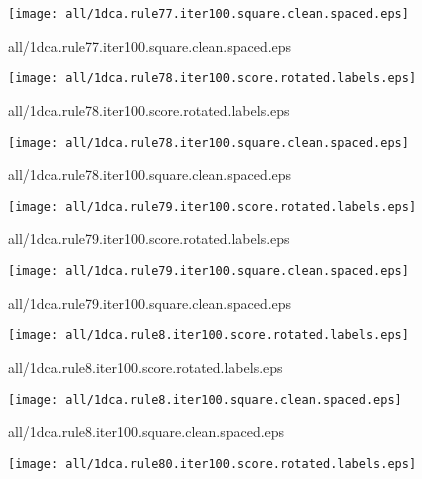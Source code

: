 \documentclass{article}
\begin{document}
\begin{center}
\begin{minipage}{\textwidth}
\texttt{[image: all/1dca.rule77.iter100.square.clean.spaced.eps]}
\end{minipage}
\end{center}
{\footnotesize all/1dca.rule77.iter100.square.clean.spaced.eps}
\begin{center}
\begin{minipage}{\textwidth}
\texttt{[image: all/1dca.rule78.iter100.score.rotated.labels.eps]}
\end{minipage}
\end{center}
{\footnotesize all/1dca.rule78.iter100.score.rotated.labels.eps}
\begin{center}
\begin{minipage}{\textwidth}
\texttt{[image: all/1dca.rule78.iter100.square.clean.spaced.eps]}
\end{minipage}
\end{center}
{\footnotesize all/1dca.rule78.iter100.square.clean.spaced.eps}
\begin{center}
\begin{minipage}{\textwidth}
\texttt{[image: all/1dca.rule79.iter100.score.rotated.labels.eps]}
\end{minipage}
\end{center}
{\footnotesize all/1dca.rule79.iter100.score.rotated.labels.eps}
\begin{center}
\begin{minipage}{\textwidth}
\texttt{[image: all/1dca.rule79.iter100.square.clean.spaced.eps]}
\end{minipage}
\end{center}
{\footnotesize all/1dca.rule79.iter100.square.clean.spaced.eps}
\begin{center}
\begin{minipage}{\textwidth}
\texttt{[image: all/1dca.rule8.iter100.score.rotated.labels.eps]}
\end{minipage}
\end{center}
{\footnotesize all/1dca.rule8.iter100.score.rotated.labels.eps}
\begin{center}
\begin{minipage}{\textwidth}
\texttt{[image: all/1dca.rule8.iter100.square.clean.spaced.eps]}
\end{minipage}
\end{center}
{\footnotesize all/1dca.rule8.iter100.square.clean.spaced.eps}
\begin{center}
\begin{minipage}{\textwidth}
\texttt{[image: all/1dca.rule80.iter100.score.rotated.labels.eps]}
\end{minipage}
\end{center}
\end{document}
